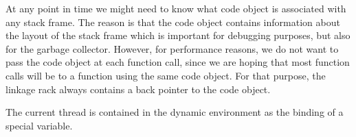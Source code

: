 At any point in time we might need to know what code object is
associated with any stack frame.  The reason is that the code object
contains information about the layout of the stack frame which is
important for debugging purposes, but also for the garbage collector.
However, for performance reasons, we do not want to pass the code
object at each function call, since we are hoping that most function
calls will be to a function using the same code object.  For that
purpose, the linkage rack always contains a back pointer to the code
object. 

The current thread is contained in the dynamic environment as the
binding of a special variable.
